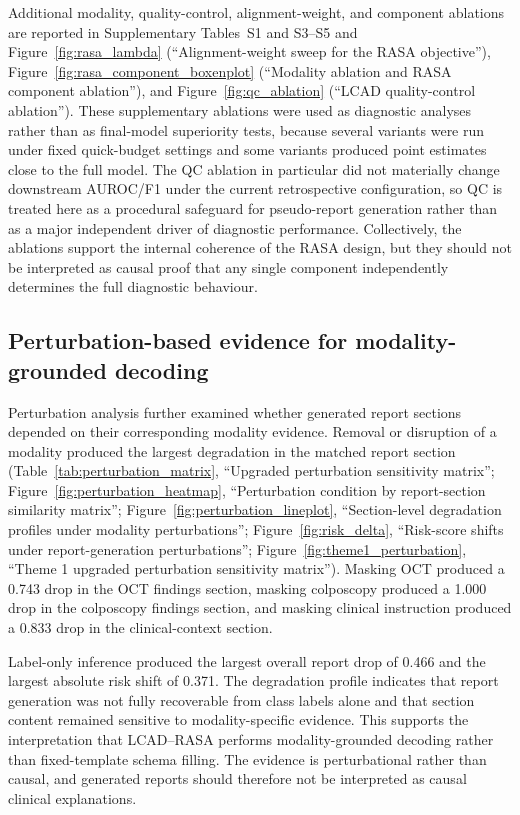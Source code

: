 Additional modality, quality-control, alignment-weight, and component ablations are reported in Supplementary Tables~S1 and S3--S5 and Figure~\ref{fig:rasa_lambda} (``Alignment-weight sweep for the RASA objective''), Figure~\ref{fig:rasa_component_boxenplot} (``Modality ablation and RASA component ablation''), and Figure~\ref{fig:qc_ablation} (``LCAD quality-control ablation''). These supplementary ablations were used as diagnostic analyses rather than as final-model superiority tests, because several variants were run under fixed quick-budget settings and some variants produced point estimates close to the full model. The QC ablation in particular did not materially change downstream AUROC/F1 under the current retrospective configuration, so QC is treated here as a procedural safeguard for pseudo-report generation rather than as a major independent driver of diagnostic performance. Collectively, the ablations support the internal coherence of the RASA design, but they should not be interpreted as causal proof that any single component independently determines the full diagnostic behaviour.

\subsection{Perturbation-based evidence for modality-grounded decoding}
\label{subsec:perturbation_results}

Perturbation analysis further examined whether generated report sections depended on their corresponding modality evidence. Removal or disruption of a modality produced the largest degradation in the matched report section (Table~\ref{tab:perturbation_matrix}, ``Upgraded perturbation sensitivity matrix''; Figure~\ref{fig:perturbation_heatmap}, ``Perturbation condition by report-section similarity matrix''; Figure~\ref{fig:perturbation_lineplot}, ``Section-level degradation profiles under modality perturbations''; Figure~\ref{fig:risk_delta}, ``Risk-score shifts under report-generation perturbations''; Figure~\ref{fig:theme1_perturbation}, ``Theme 1 upgraded perturbation sensitivity matrix''). Masking OCT produced a 0.743 drop in the OCT findings section, masking colposcopy produced a 1.000 drop in the colposcopy findings section, and masking clinical instruction produced a 0.833 drop in the clinical-context section.

Label-only inference produced the largest overall report drop of 0.466 and the largest absolute risk shift of 0.371. The degradation profile indicates that report generation was not fully recoverable from class labels alone and that section content remained sensitive to modality-specific evidence. This supports the interpretation that LCAD--RASA performs modality-grounded decoding rather than fixed-template schema filling. The evidence is perturbational rather than causal, and generated reports should therefore not be interpreted as causal clinical explanations.

